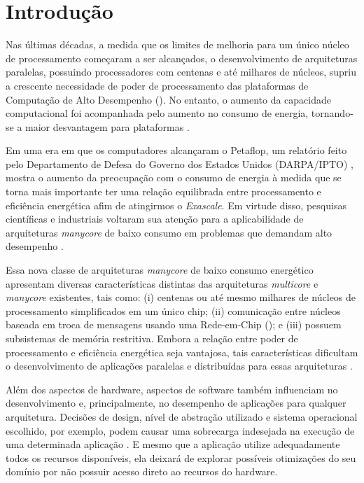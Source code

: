 \documentclass[
	12pt,				%
	openright,			%
	twoside,			%
	a4paper,			%
	english,			%
	brazil,				%
	]{abntex2}
\begin{document}
\chapter{Introdução}
\label{cap:introducao}

    Nas últimas décadas, a medida que os limites de melhoria para um único
    núcleo de processamento começaram a ser alcançados, o desenvolvimento
    de arquiteturas paralelas, possuindo processadores com centenas e até
    milhares de núcleos, supriu a crescente necessidade de poder de
    processamento das plataformas de Computação de Alto Desempenho (\hpc).
    No entanto, o aumento da capacidade computacional foi acompanhada pelo
    aumento no consumo de energia, tornando-se a maior desvantagem para
    plataformas \hpc.
    
    Em uma era em que os computadores alcançaram o Petaflop, um relatório
    feito pelo Departamento de Defesa do Governo dos Estados Unidos
    (DARPA/IPTO) \cite{darpa:exascale}, mostra o aumento da preocupação
    com o consumo de energia à medida que se torna mais importante ter uma
    relação equilibrada entre processamento e eficiência energética afim de
    atingirmos o \textit{Exascale}. Em virtude disso, pesquisas científicas
    e industriais voltaram sua atenção para a aplicabilidade de arquiteturas
    \textit{manycore} de baixo consumo em problemas que demandam alto
    desempenho \cite{Castro-SBAC-PAD:2014, Castro-PARCO:2016}.
    
    Essa nova classe de arquiteturas \textit{manycore} de baixo consumo
    energético apresentam diversas características distintas das arquiteturas
    \textit{multicore} e \textit{manycore} existentes, tais como: 
    (i) centenas ou até mesmo milhares de núcleos de processamento
    simplificados em um único chip;
    (ii) comunicação entre núcleos baseada em troca de mensagens usando
    uma Rede-em-Chip (\noc); e 
    (iii) possuem subsistemas de memória restritiva.
    Embora a relação entre poder de processamento e eficiência energética
    seja vantajosa, tais características dificultam o desenvolvimento de aplicações
    paralelas e distribuídas para essas arquiteturas
     \cite{Castro-Souza-CCPE:2016, Castro-PARCO:2016, os:rmen}.
    
    Além dos aspectos de hardware, aspectos de software também influenciam
    no desenvolvimento e, principalmente, no desempenho de aplicações para
    qualquer arquitetura.
    Decisões de design, nível de abstração utilizado e sistema operacional
    escolhido, por exemplo, podem causar uma sobrecarga indesejada na execução
    de uma determinada aplicação \cite{Appel:1991:VMP:106972.106984, Cao:1994:IPA:1267638.1267651, Harty:1992:APM:143365.143511, Krueger:1993:TDA:165854.165867, Stonebraker:1981:OSS:358699.358703, Levy:Exception, hunt_singularity:_2007}.
    E mesmo que a aplicação utilize adequadamente todos os recursos
    disponíveis, ela deixará de explorar possíveis otimizações do seu
    domínio por não possuir acesso direto ao recursos do hardware.
    
\end{document}
